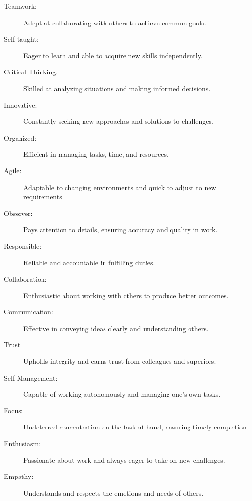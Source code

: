 
\begin{description}
    \item[Teamwork:] Adept at collaborating with others to achieve common goals.
    \item[Self-taught:] Eager to learn and able to acquire new skills independently.
    \item[Critical Thinking:] Skilled at analyzing situations and making informed decisions.
    \item[Innovative:] Constantly seeking new approaches and solutions to challenges.
    \item[Organized:] Efficient in managing tasks, time, and resources.
    \item[Agile:] Adaptable to changing environments and quick to adjust to new requirements.
    \item[Observer:] Pays attention to details, ensuring accuracy and quality in work.
    \item[Responsible:] Reliable and accountable in fulfilling duties.
    \item[Collaboration:] Enthusiastic about working with others to produce better outcomes.
    \item[Communication:] Effective in conveying ideas clearly and understanding others.
    \item[Trust:] Upholds integrity and earns trust from colleagues and superiors.
    \item[Self-Management:] Capable of working autonomously and managing one's own tasks.
    \item[Focus:] Undeterred concentration on the task at hand, ensuring timely completion.
    \item[Enthusiasm:] Passionate about work and always eager to take on new challenges.
    \item[Empathy:] Understands and respects the emotions and needs of others.
\end{description}
